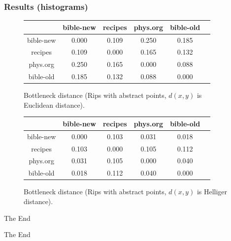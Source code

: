 \documentclass[unknownkeysallowed]{beamer}
\begin{document}
\begin{frame}
\frametitle{Results (histograms)}

\begin{figure}
\begin{tabular}{ c c c c c c }
	& bible-new & recipes & phys.org & bible-old \\
  	\hline 
  bible-new   & 0.000 & 0.109 & 0.250 & 0.185\\
  recipes     & 0.109 & 0.000 & 0.165 & 0.132\\
  phys.org    & 0.250 & 0.165 & 0.000 & 0.088\\
  bible-old   & 0.185 & 0.132 & 0.088 & 0.000\\
\end{tabular}
\caption{Bottleneck distance (Rips with abstract points,  
$d(x,y)$ is Euclidean distance).}
\end{figure}

\begin{figure}
\begin{tabular}{ c c c c c c }
	& bible-new & recipes & phys.org & bible-old \\
  	\hline
    bible-new   &0.000 & 0.103 & 0.031 & 0.018 \\
    recipes     &0.103 & 0.000 & 0.105 & 0.112 \\
    phys.org    &0.031 & 0.105 & 0.000 & 0.040 \\
    bible-old   &0.018 & 0.112 & 0.040 & 0.000 \\
\end{tabular}
\caption{Bottleneck distance (Rips with abstract points, 
$d(x,y)$ is Helliger distance).}
\end{figure}

\end{frame}

\begin{frame}{The End}
\Huge{\centerline{The End}}
\end{frame}

\end{document}
